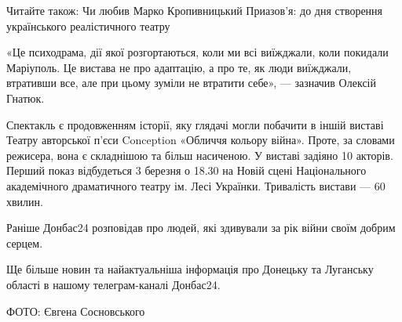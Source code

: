 Читайте також: Чи любив Марко Кропивницький Приазов'я: до дня створення
українського реалістичного театру

«Це психодрама, дії якої розгортаються, коли ми всі виїжджали, коли покидали Маріуполь. Це вистава не про адаптацію, а про те, як люди виїжджали, втративши все, але при цьому зуміли не втратити себе», — зазначив Олексій Гнатюк.

Спектакль є продовженням історії, яку глядачі могли побачити в іншій виставі Театру авторської п'єси Conception «Обличчя кольору війна». Проте, за словами режисера, вона є складнішою та більш насиченою. У виставі задіяно 10 акторів. Перший показ відбудеться 3 березня о 18.30 на Новій сцені Національного академічного драматичного театру ім. Лесі Українки. Тривалість вистави — 60 хвилин.

Раніше Донбас24 розповідав про людей, які здивували за рік війни своїм добрим серцем.

Ще більше новин та найактуальніша інформація про Донецьку та Луганську області в нашому телеграм-каналі Донбас24.

ФОТО: Євгена Сосновського 
